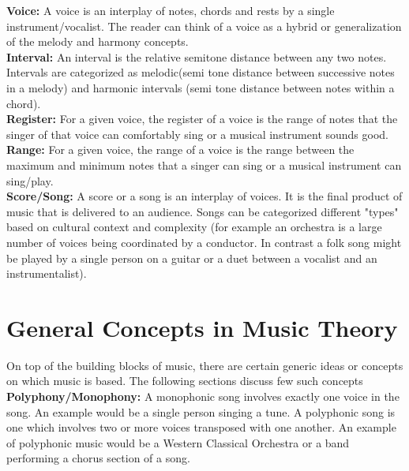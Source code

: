 \noindent \textbf{Voice:} A voice is an interplay of notes, chords and rests by a single instrument/vocalist. The reader can think of a voice as a hybrid or generalization of the melody and harmony concepts. \\

\noindent \textbf{Interval:} \label{interval} An interval is the relative semitone distance between any two notes. Intervals are categorized as melodic(semi tone distance between successive notes in a melody) and harmonic intervals (semi tone distance between notes within a chord). \\

\noindent \textbf{Register:} For a given voice, the register of a voice is the range of notes that the singer of that voice can comfortably sing or a musical instrument sounds good. \\

\noindent \textbf{Range:} For a given voice, the range of a voice is the range between the maximum and minimum notes that a singer can sing or a musical instrument can sing/play.  \\

\noindent \textbf{Score/Song:} A score or a song is an interplay of voices. It is the final product of music that is delivered to an audience. Songs can be categorized different "types" based on cultural context and complexity (for example an orchestra is a large number of voices being coordinated by a conductor. In contrast a folk song might be played by a single person on a guitar or a duet between a vocalist and an instrumentalist). 


\section{General Concepts in Music Theory}

\noindent On top of the building blocks of music, there are certain generic ideas or concepts on which music is based. The following sections discuss few such concepts \\

\noindent \textbf{Polyphony/Monophony:} A monophonic song involves exactly one voice in the song. An example would be a single person singing a tune. A polyphonic song is one which involves two or more voices transposed with one another. An example of polyphonic music would be a Western Classical Orchestra or a band performing a chorus section of a song. \\

